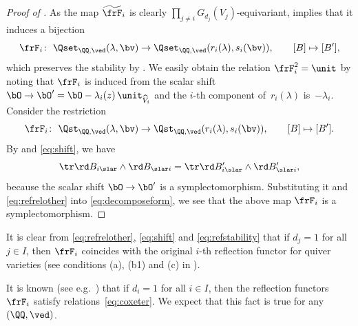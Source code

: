 \begin{proof}[Proof of ]
As the map $\widetilde{\frF}_i$ is clearly
$\prod\limits_{j \neq i}G_{d_j}(V_j)$-equivariant,
 implies
that it induces a bijection
\[
\frF_i \colon \  \Qset_{\QQ,\ved}(\lambda,\bv) \to \Qset_{\QQ,\ved}(r_i(\lambda),s_i(\bv)),
\qquad [B] \mapsto [B'],
\]
which preserves the stability by .
We easily obtain the relation $\frF_i^2 = \unit$
by noting that $\frF_i$ is induced from the scalar shift
$\bO \to \bO'=\bO -\lambda_i(z)\,\unit_{\widehat{V}_i}$
and the $i$-th component of~$r_i(\lambda)$ is~$-\lambda_i$.
Consider the restriction
\[
\frF_i \colon \ \Qst_{\QQ,\ved}(\lambda,\bv) \to \Qst_{\QQ,\ved}(r_i(\lambda),s_i(\bv)),
\qquad [B] \mapsto [B'].
\]
By  and \eqref{eq:shift},
we have
\[
\tr \rd B_{i \slar} \wedge \rd B_{\slar i} =
\tr \rd B'_{i \slar} \wedge \rd B'_{\slar i},
\]
because the scalar shift
$\bO \to \bO'$
is a symplectomorphism.
Substituting it and \eqref{eq:refrelother}
into \eqref{eq:decomposeform},
we see that the above map $\frF_i$
is a symplectomorphism.
\end{proof}

\begin{Remark}\label{rem:original-ref}
It is clear from \eqref{eq:refrelother}, \eqref{eq:shift}
and \eqref{eq:refstability} that if $d_j=1$ for all $j \in I$,
then $\frF_i$ coincides with the original $i$-th ref\/lection functor
for quiver varieties
(see conditions (a), (b1) and (c) in \cite[Section 3]{MR1623674}).
\end{Remark}

\begin{Remark}\label{rem:ref-relation}
It is known (see e.g.\ \cite{MR1775358}) that if $d_i=1$ for all $i \in I$,
then the ref\/lection functors~$\frF_i$ satisfy relations~\eqref{eq:coxeter}.
We expect that this fact is true for any~$(\QQ,\ved)$.
\end{Remark}

